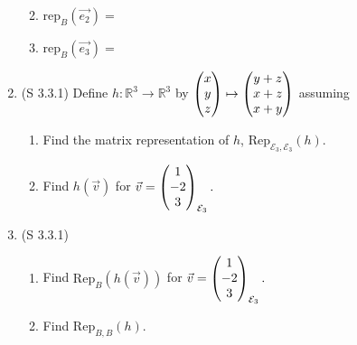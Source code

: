 \documentclass[11pt,fleqn]{article}
\begin{document}
\begin{enumerate}
\begin{multicols}{2}
\begin{enumerate}
	\vfill
	\item $\text{rep}_{B}(\vec{e_2})=$\\
	\vspace{1in}

	\vfill
	\item $\text{rep}_{B}(\vec{e_3})=$\\
	\vspace{1in}

	\vfill
	\end{enumerate}
\end{multicols}
\newpage
\item (S 3.3.1) Define $h:\mathbb{R}^3 \to \mathbb{R}^3$ by $\begin{pmatrix} x\\y\\z \end{pmatrix} \mapsto \begin{pmatrix} y+z \\ x+z \\ x+y \end{pmatrix}$ assuming \underline{\hspace{2in}} \\
\begin{enumerate}
	\item Find the matrix representation of $h$, $\text{Rep}_{\mathcal{E}_3,\mathcal{E}_3}(h).$
	\vfill
	\item Find $h(\vec{v})$ for $\vec{v}=\begin{pmatrix} 1\\-2\\3\end{pmatrix}_{\mathcal{E}_3}.$
	\vfill
	\end{enumerate}

\item (S 3.3.1) 
	\begin{enumerate}
	\item Find $\text{Rep}_B(h(\vec{v}))$ for $\vec{v}=\begin{pmatrix} 1\\-2\\3\end{pmatrix}_{\mathcal{E}_3}.$
	\vspace{3in}

	\item Find $\text{Rep}_{B,B}(h).$
	\vfill
	
	\end{enumerate}
\end{enumerate}
\end{document}
